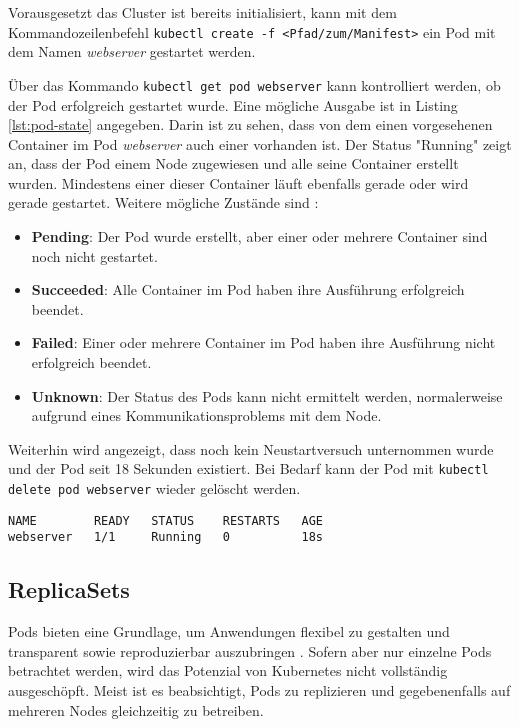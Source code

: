 \documentclass[11pt,a4paper]{article}
\begin{document}
Vorausgesetzt das Cluster ist bereits initialisiert, kann mit dem Kommandozeilenbefehl
\lstinline|kubectl create -f <Pfad/zum/Manifest>|
ein Pod mit dem Namen \emph{webserver} gestartet werden.

Über das Kommando \lstinline|kubectl get pod webserver| kann kontrolliert werden,
ob der Pod erfolgreich gestartet wurde. Eine mögliche Ausgabe ist in
Listing \ref{lst:pod-state} angegeben. Darin ist zu sehen, dass
von dem einen vorgesehenen Container im Pod \emph{webserver} auch einer vorhanden ist.
Der Status "Running" zeigt an, dass der Pod einem Node zugewiesen und alle seine Container erstellt wurden.
Mindestens einer dieser Container läuft ebenfalls gerade oder wird gerade gestartet.
Weitere mögliche Zustände sind \cite{kubernetes.io_pod_lifecycle}:
\begin{itemize}
  \item \textbf{Pending}: Der Pod wurde erstellt, aber einer oder mehrere Container sind noch nicht gestartet.
  \item \textbf{Succeeded}: Alle Container im Pod haben ihre Ausführung erfolgreich beendet.
  \item \textbf{Failed}: Einer oder mehrere Container im Pod haben ihre Ausführung nicht erfolgreich beendet.
  \item \textbf{Unknown}: Der Status des Pods kann nicht ermittelt werden, normalerweise aufgrund eines Kommunikationsproblems mit dem Node.
\end{itemize}
Weiterhin wird angezeigt, dass noch kein Neustartversuch unternommen wurde
und der Pod seit 18 Sekunden existiert.
Bei Bedarf kann der Pod mit \lstinline|kubectl delete pod webserver| wieder gelöscht werden.

\begin{lstlisting}[caption={Der Pod wurde erfolgreich gestartet.}, label={lst:pod-state}]
NAME        READY   STATUS    RESTARTS   AGE
webserver   1/1     Running   0          18s
\end{lstlisting}

\subsection{ReplicaSets}
Pods bieten eine Grundlage, um Anwendungen flexibel zu gestalten und
transparent sowie reproduzierbar auszubringen \cite{Schmeling_Dargatz_2022}.
Sofern aber nur einzelne Pods betrachtet werden, wird das Potenzial von Kubernetes
nicht vollständig ausgeschöpft.
Meist ist es beabsichtigt, Pods zu replizieren und gegebenenfalls
auf mehreren Nodes gleichzeitig zu betreiben.
\end{document}

